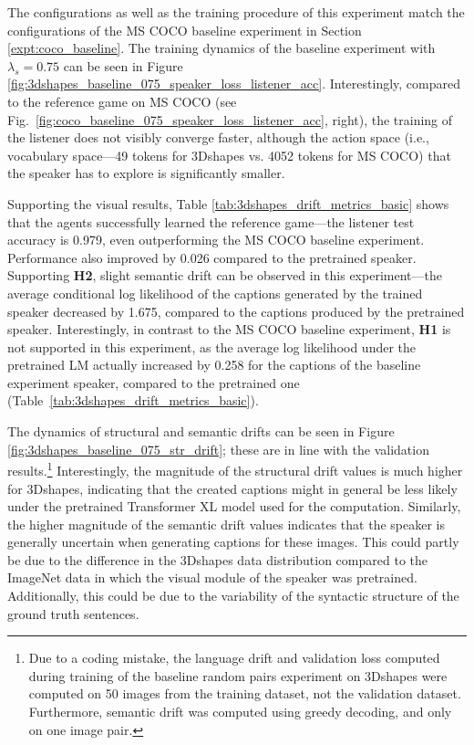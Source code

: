 The configurations as well as the training procedure of this experiment match the configurations of the MS COCO baseline experiment in Section \ref{expt:coco_baseline}. The training dynamics of the baseline experiment with $\lambda_s = 0.75$ can be seen in Figure \ref{fig:3dshapes_baseline_075_speaker_loss_listener_acc}. Interestingly, compared to the reference game on MS COCO (see Fig.~\ref{fig:coco_baseline_075_speaker_loss_listener_acc}, right), the training of the listener does not visibly converge faster, although the action space (i.e., vocabulary space---49 tokens for 3Dshapes vs. 4052 tokens for MS COCO) that the speaker has to explore is significantly smaller. 
 
Supporting the visual results, Table \ref{tab:3dshapes_drift_metrics_basic} shows that the agents successfully learned the reference game---the listener test accuracy is 0.979, even outperforming the MS COCO baseline experiment. Performance also improved by 0.026 compared to the pretrained speaker. 
Supporting \textbf{H2}, slight semantic drift can be observed in this experiment---the average conditional log likelihood of the captions generated by the trained speaker decreased by 1.675, compared to the captions produced by the pretrained speaker. Interestingly, in contrast to the MS COCO baseline experiment, \textbf{H1} is not supported in this experiment, as the average log likelihood under the pretrained LM actually increased by 0.258 for the captions of the baseline experiment speaker, compared to the pretrained one (Table~\ref{tab:3dshapes_drift_metrics_basic}).
 
The dynamics of structural and semantic drifts can be seen in Figure \ref{fig:3dshapes_baseline_075_str_drift}; these are in line with the validation results.\footnote{Due to a coding mistake, the language drift and validation loss computed during training of the baseline random pairs experiment on 3Dshapes were computed on 50 images from the training dataset, not the validation dataset. Furthermore, semantic drift was computed using greedy decoding, and only on one image pair.} 
Interestingly, the magnitude of the structural drift values is much higher for 3Dshapes, indicating that the created captions might in general be less likely under the pretrained Transformer XL model used for the computation. Similarly, the higher magnitude of the semantic drift values indicates that the speaker is generally uncertain when generating captions for these images. This could partly be due to the difference in the 3Dshapes data distribution compared to the ImageNet data in which the visual module of the speaker was pretrained. Additionally, this could be due to the variability of the syntactic structure of the ground truth sentences. 

